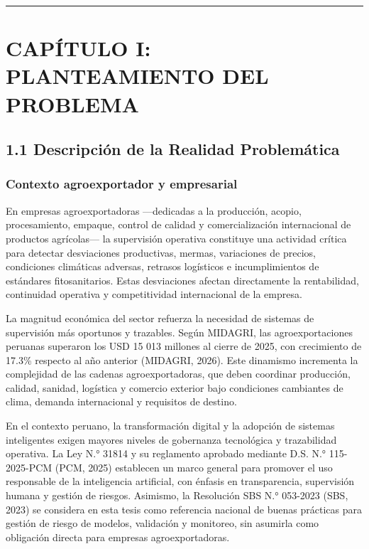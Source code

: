 \begin{center}\rule{0.5\linewidth}{0.5pt}\end{center}

\section{CAPÍTULO I: PLANTEAMIENTO DEL
PROBLEMA}\label{capuxedtulo-i-planteamiento-del-problema}

\subsection{1.1 Descripción de la Realidad
Problemática}\label{descripciuxf3n-de-la-realidad-problemuxe1tica}

\subsubsection{Contexto agroexportador y
empresarial}\label{contexto-agroexportador-y-empresarial}

En empresas agroexportadoras ---dedicadas a la producción, acopio,
procesamiento, empaque, control de calidad y comercialización
internacional de productos agrícolas--- la supervisión operativa
constituye una actividad crítica para detectar desviaciones productivas,
mermas, variaciones de precios, condiciones climáticas adversas,
retrasos logísticos e incumplimientos de estándares fitosanitarios.
Estas desviaciones afectan directamente la rentabilidad, continuidad
operativa y competitividad internacional de la empresa.

La magnitud económica del sector refuerza la necesidad de sistemas de
supervisión más oportunos y trazables. Según MIDAGRI, las
agroexportaciones peruanas superaron los USD 15 013 millones al cierre
de 2025, con crecimiento de 17.3\% respecto al año anterior (MIDAGRI,
2026). Este dinamismo incrementa la complejidad de las cadenas
agroexportadoras, que deben coordinar producción, calidad, sanidad,
logística y comercio exterior bajo condiciones cambiantes de clima,
demanda internacional y requisitos de destino.

En el contexto peruano, la transformación digital y la adopción de
sistemas inteligentes exigen mayores niveles de gobernanza tecnológica y
trazabilidad operativa. La Ley N.° 31814 y su reglamento aprobado
mediante D.S. N.° 115-2025-PCM (PCM, 2025) establecen un marco general
para promover el uso responsable de la inteligencia artificial, con
énfasis en transparencia, supervisión humana y gestión de riesgos.
Asimismo, la Resolución SBS N.° 053-2023 (SBS, 2023) se considera en
esta tesis como referencia nacional de buenas prácticas para gestión de
riesgo de modelos, validación y monitoreo, sin asumirla como obligación
directa para empresas agroexportadoras.

